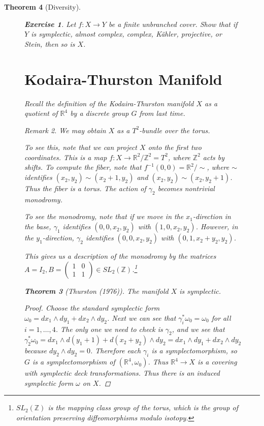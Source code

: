 \documentclass[leqno, openany]{memoir}
\newtheorem{thm}{Theorem}[chapter]
\theoremstyle{definition}
\newtheorem{exer}[thm]{Exercise}
\theoremstyle{remark}
\newtheorem{rmk}[thm]{Remark}
\theoremstyle{plain}
\theoremstyle{definition}
\theoremstyle{remark}
\newcommand{\R}{\mathbb{R}}
\newcommand{\Z}{\mathbb{Z}}
\begin{document}
\begin{thm}[Diversity]
\begin{figure}[H]
\begin{exer} Let $f: X \to Y$ be a finite unbranched cover. Show that if $Y$ is
symplectic, almost complex, complex, K\"ahler, projective, or Stein, then so is
$X$.  \end{exer}

\section{Kodaira-Thurston Manifold}%

Recall the definition of the Kodaira-Thurston manifold $X$ as a quotient of
$\R^4$ by a discrete group $G$ from last time.

\begin{rmk} We may obtain $X$ as a $T^2$-bundle over the torus.  \end{rmk}

To see this, note that we can project $X$ onto the first two coordinates. This
is a map $f: X \to \R^2/\Z^2 = T^2$, where $\Z^2$ acts by shifts. To compute
the fiber, note that $f^{-1}(0,0) = \R^2/\sim$, where $\sim$ identifies $(x_2,
y_2) \sim (x_2 + 1, y_2)$ and $(x_2,y_2) \sim (x_2, y_2 + 1)$. Thus the fiber
is a torus. The action of $\gamma_2$ becomes nontrivial monodromy.

To see the monodromy, note that if we move in the $x_1$-direction in the base,
$\gamma_1$ identifies $(0,0,x_2,y_2)$ with $(1,0,x_2, y_2)$. However, in the
$y_1$-direction, $\gamma_2$ identifies $(0,0,x_2, y_2)$ with
$(0,1,x_2+y_2,y_2)$.

This gives us a description of the monodromy by the matrices $A = I_2, B =
\begin{pmatrix} 1 & 0 \\ 1 & 1 \end{pmatrix} \in SL_2(\Z)$.\footnote{$SL_2(\Z)$
is the mapping class group of the torus, which is the group of orientation
preserving diffeomorphisms modulo isotopy.}

\begin{thm}[Thurston (1976)] The manifold $X$ is symplectic.  \end{thm}

\begin{proof} Choose the standard symplectic form $\omega_0 = dx_1 \wedge dy_1
    + dx_2 \wedge dy_2$. Next we can see that $\gamma_i^*\omega_0 = \omega_0$
    for all $i = 1, \ldots, 4$. The only one we need to check is $\gamma_2$,
    and we see that \[ \gamma_2^* \omega_0 = d x_1 \wedge d(y_1 + 1) + d(x_2 +
    y_2) \wedge dy_2 = dx_1 \wedge dy_1 + dx_2 \wedge dy_2 \] because $dy_2
    \wedge dy_2 = 0$. Therefore each $\gamma_i$ is a symplectomorphism, so $G$
    is a symplectomorphism of $(\R^4, \omega_0)$. Thus $\R^4 \to X$ is a
    covering with symplectic deck transformations. Thus there is an induced
    symplectic form $\omega$ on $X$.  \end{proof}


\end{figure}
\end{thm}
\end{document}
